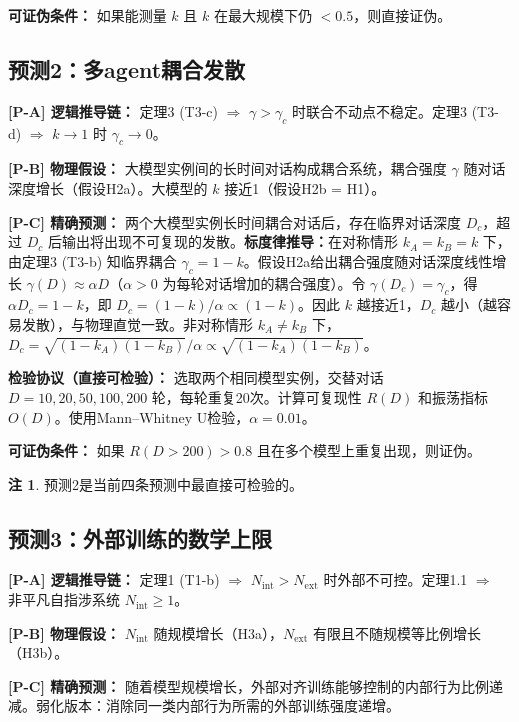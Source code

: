 \documentclass[12pt,a4paper]{article}
\theoremstyle{definition}
\newtheorem{remark}[theorem]{注}
\newcommand{\Nint}{N_{\mathrm{int}}}
\newcommand{\Next}{N_{\mathrm{ext}}}
\newcommand{\gamc}{\gamma_c}
\begin{document}
\textbf{可证伪条件：} 如果能测量 $k$ 且 $k$ 在最大规模下仍 $< 0.5$，则直接证伪。

\subsection{预测2：多agent耦合发散}

\textbf{[P-A] 逻辑推导链：} 定理3 (T3-c) $\Rightarrow$ $\gamma > \gamc$ 时联合不动点不稳定。定理3 (T3-d) $\Rightarrow$ $k \to 1$ 时 $\gamc \to 0$。

\textbf{[P-B] 物理假设：} 大模型实例间的长时间对话构成耦合系统，耦合强度 $\gamma$ 随对话深度增长（假设H2a）。大模型的 $k$ 接近1（假设H2b = H1）。

\textbf{[P-C] 精确预测：} 两个大模型实例长时间耦合对话后，存在临界对话深度 $D_c$，超过 $D_c$ 后输出将出现不可复现的发散。\textbf{标度律推导：}在对称情形 $k_A = k_B = k$ 下，由定理3 (T3-b) 知临界耦合 $\gamc = 1-k$。假设H2a给出耦合强度随对话深度线性增长 $\gamma(D) \approx \alpha D$（$\alpha > 0$ 为每轮对话增加的耦合强度）。令 $\gamma(D_c) = \gamc$，得 $\alpha D_c = 1-k$，即 $D_c = (1-k)/\alpha \propto (1-k)$。因此 $k$ 越接近1，$D_c$ 越小（越容易发散），与物理直觉一致。非对称情形 $k_A \neq k_B$ 下，$D_c = \sqrt{(1-k_A)(1-k_B)}/\alpha \propto \sqrt{(1-k_A)(1-k_B)}$。

\textbf{检验协议（直接可检验）：} 选取两个相同模型实例，交替对话 $D = 10, 20, 50, 100, 200$ 轮，每轮重复20次。计算可复现性 $R(D)$ 和振荡指标 $O(D)$。使用Mann--Whitney U检验，$\alpha = 0.01$。

\textbf{可证伪条件：} 如果 $R(D > 200) > 0.8$ 且在多个模型上重复出现，则证伪。

\begin{remark}
预测2是当前四条预测中最直接可检验的。
\end{remark}

\subsection{预测3：外部训练的数学上限}

\textbf{[P-A] 逻辑推导链：} 定理1 (T1-b) $\Rightarrow$ $\Nint > \Next$ 时外部不可控。定理1.1 $\Rightarrow$ 非平凡自指涉系统 $\Nint \geq 1$。

\textbf{[P-B] 物理假设：} $\Nint$ 随规模增长（H3a），$\Next$ 有限且不随规模等比例增长（H3b）。

\textbf{[P-C] 精确预测：} 随着模型规模增长，外部对齐训练能够控制的内部行为比例递减。弱化版本：消除同一类内部行为所需的外部训练强度递增。
\end{document}
